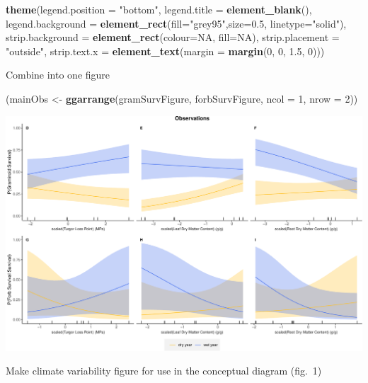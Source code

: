 \documentclass[
]{article}
\newenvironment{Shaded}{\begin{snugshade}}{\end{snugshade}}
\newcommand{\DataTypeTok}[1]{\textcolor[rgb]{0.13,0.29,0.53}{#1}}
\newcommand{\DecValTok}[1]{\textcolor[rgb]{0.00,0.00,0.81}{#1}}
\newcommand{\FloatTok}[1]{\textcolor[rgb]{0.00,0.00,0.81}{#1}}
\newcommand{\KeywordTok}[1]{\textcolor[rgb]{0.13,0.29,0.53}{\textbf{#1}}}
\newcommand{\NormalTok}[1]{#1}
\newcommand{\OtherTok}[1]{\textcolor[rgb]{0.56,0.35,0.01}{#1}}
\newcommand{\StringTok}[1]{\textcolor[rgb]{0.31,0.60,0.02}{#1}}
\begin{document}
\begin{Shaded}
\begin{Highlighting}[]
\StringTok{  }\KeywordTok{theme}\NormalTok{(}\DataTypeTok{legend.position =} \StringTok{"bottom"}\NormalTok{, }\DataTypeTok{legend.title =} \KeywordTok{element\_blank}\NormalTok{(), }\DataTypeTok{legend.background =} \KeywordTok{element\_rect}\NormalTok{(}\DataTypeTok{fill=}\StringTok{"grey95"}\NormalTok{,}\DataTypeTok{size=}\FloatTok{0.5}\NormalTok{, }\DataTypeTok{linetype=}\StringTok{"solid"}\NormalTok{), }\DataTypeTok{strip.background =} \KeywordTok{element\_rect}\NormalTok{(}\DataTypeTok{colour=}\OtherTok{NA}\NormalTok{, }\DataTypeTok{fill=}\OtherTok{NA}\NormalTok{), }\DataTypeTok{strip.placement =} \StringTok{"outside"}\NormalTok{, }\DataTypeTok{strip.text.x =} \KeywordTok{element\_text}\NormalTok{(}\DataTypeTok{margin =} \KeywordTok{margin}\NormalTok{(}\DecValTok{0}\NormalTok{, }\DecValTok{0}\NormalTok{, }\FloatTok{1.5}\NormalTok{, }\DecValTok{0}\NormalTok{))) }
\end{Highlighting}
\end{Shaded}

Combine into one figure

\begin{Shaded}
\begin{Highlighting}[]
\NormalTok{(mainObs \textless{}{-}}\StringTok{ }\KeywordTok{ggarrange}\NormalTok{(gramSurvFigure, forbSurvFigure, }\DataTypeTok{ncol =} \DecValTok{1}\NormalTok{, }\DataTypeTok{nrow =} \DecValTok{2}\NormalTok{))}
\end{Highlighting}
\end{Shaded}

\includegraphics{figures/mainObservationsFig-1.pdf}

Make climate variability figure for use in the conceptual diagram
(fig.~1)
\end{document}
